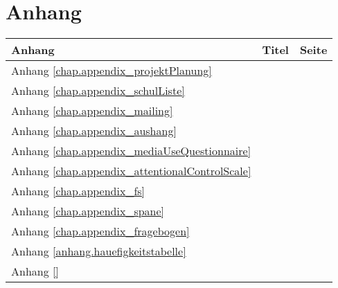 %
%
\glsresetall
\let\raggedsection\centering 
\chapter*{Anhang}\label{chap.appendixStart}
\let\raggedsection\raggedright 
\begin{RaggedRight}
\begin{table}[H] 
    \centering
    \begin{tabular}[t]{L{30mm} L{100mm} R{20mm}}       
        \textbf{Anhang} & \textbf{Titel} & \textbf{Seite}\\
        \hline
        Anhang \ref{chap.appendix_projektPlanung} &  & \pageref{chap.appendix_projektPlanung}\\
        Anhang \ref{chap.appendix_schulListe} &  & \pageref{chap.appendix_schulListe} \\ 
        Anhang \ref{chap.appendix_mailing} &  & \pageref{chap.appendix_mailing} \\ 
        Anhang \ref{chap.appendix_aushang} &  & \pageref{chap.appendix_aushang} \\ 
        Anhang \ref{chap.appendix_mediaUseQuestionnaire} &  & \pageref{chap.appendix_mediaUseQuestionnaire} \\ 
        Anhang \ref{chap.appendix_attentionalControlScale} &  & \pageref{chap.appendix_attentionalControlScale} \\ 
        Anhang \ref{chap.appendix_fs} &  & \pageref{chap.appendix_fs} \\ 
        Anhang \ref{chap.appendix_spane} &  & \pageref{chap.appendix_spane} \\ 
        Anhang \ref{chap.appendix_fragebogen} &  & \pageref{chap.appendix_fragebogen} \\ 
        Anhang \ref{anhang.hauefigkeitstabelle} &  & \pageref{anhang.hauefigkeitstabelle} \\ 
        Anhang \ref{} & \nameref{} & \pageref{} \\ 
    \end{tabular}
    \label{table.anhangsverzeichnis}
\end{table}
\end{RaggedRight}

